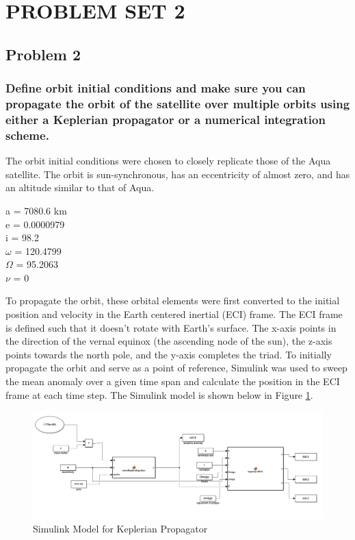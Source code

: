 \section{\Large PROBLEM SET 2}
\subsection{Problem 2}

\subsubsection{Define orbit initial conditions and make sure you can propagate the orbit of the satellite over multiple orbits using either a Keplerian propagator or a numerical integration scheme.}

The orbit initial conditions were chosen to closely replicate those of the Aqua satellite. The orbit is sun-synchronous, has an eccentricity of almost zero, and has an altitude similar to that of Aqua.

\begin{center}
    a = 7080.6 km \\
    e = 0.0000979 \\
    i = 98.2\degree \\
    $\omega$ = 120.4799\degree \\
    $\Omega$ = 95.2063\degree \\
    $\nu$ = 0\degree
\end{center}

To propagate the orbit, these orbital elements were first converted to the initial position and velocity in the Earth centered inertial (ECI) frame. The ECI frame is defined such that it doesn't rotate with Earth's surface. The x-axis points in the direction of the vernal equinox (the ascending node of the sun), the z-axis points towards the north pole, and the y-axis completes the triad. To initially propagate the orbit and serve as a point of reference, Simulink was used to sweep the mean anomaly over a given time span and calculate the position in the ECI frame at each time step. The Simulink model is shown below in Figure \ref{fig:simulink-prop}.

\begin{figure}[H]
    \centering
    \includegraphics[width = 15.5cm]{Images/simulink_prop.png}
    \caption{Simulink Model for Keplerian Propagator}
    \label{fig:simulink-prop}
\end{figure}

